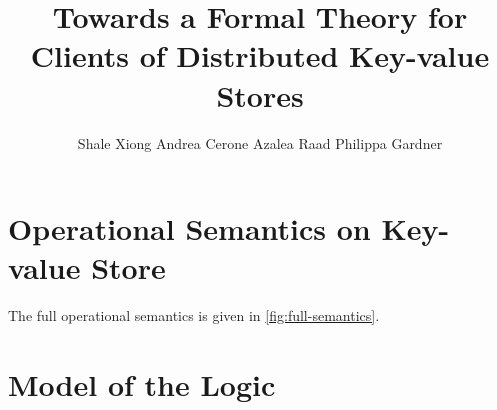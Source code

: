 \documentclass[runningheads]{llncs}
\newcommand{\RootPath}{.}
\newif\ifTechReport
\begin{document}
\title{
	Towards a Formal Theory for Clients of Distributed Key-value Stores
    } 

\author{%
Shale Xiong
Andrea Cerone
Azalea Raad
Philippa Gardner
}
%


%

\maketitle

\begin{abstract}
    
\end{abstract}








%




\newpage
\appendix
\ifTechReport
\else
\section{Operational Semantics on Key-value Store}
\label{sec:full-semantics}
The full operational semantics is given in \cref{fig:full-semantics}.






\section{Model of the Logic}
\label{sec:model-of-logic}





\fi
\end{document}
